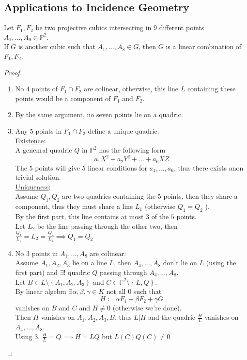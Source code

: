 \documentclass[../main.tex]{subfiles}
\begin{document}
\subsection{Applications to Incidence Geometry}
\begin{thm}
	Let $F_1,F_2$ be two projective cubics intersecting in $9$ different points $A_1,\ldots, A_9\in \mathbb{P}^{2}$.\\
	If $G$ is another cubic such that $A_1,\ldots, A_8\in G$, then $G$ is a linear combination of $F_1,F_2$.
\end{thm}
\begin{proof}
\begin{enumerate}
\item No 4 points of $F_1\cap F_2$ are colinear, otherwise, this line $L$ containing these points would be a component of $F_1$ and $F_2$.
\item By the same argument, no seven points lie on a quadric.
\item Any 5 points in $F_1\cap F_2$ define a unique quadric.\\
\underline{Existence}:\\
A genenral quadric $Q$ in $\mathbb{P}^{2}$ has the following form
\[ 
a_1X^{2}+ a_2Y^{2}+ \ldots + a_6 XZ
\]
The 5 points will give 5 linear conditions for $a_1, \ldots, a_6$, thus there exists  anon trivial solution.\\
\underline{Uniqueness}:\\
Assume $Q_1,Q_2$ are two quadrics containing the $5$ points, then they share a component, thus they must share a line $L_1$ (otherwise $Q_1= Q_2$ ).\\
By the first part, this line contains at most 3 of the $5$ points.\\
Let $L_2$ be the line passing through the other two, then $ \frac{Q_1}{L_1}= L_2= \frac{Q_2}{L_1}\implies Q_1= Q_2$ 
\item No $3$ points in $A_1,\ldots, A_8$ are colinear: \\
	Assume $A_1,A_2,A_3$ lie on a line $L$, then $A_4,\ldots, A_8$ don't lie on $L$ (using the first part) and $\exists!$ quadric $Q$ passing through  $A_4,\ldots, A_8$.\\
	Let $B\in L\setminus \left\{ A_1,A_2,A_3 \right\} $ and $C\in \mathbb{P}^{2}\setminus \left\{ L,Q \right\} $.\\
	By linear algebra $\exists \alpha,\beta,\gamma\in K$ not all $0$ such that
	\[ 
	H \coloneqq  \alpha F_1 + \beta F_2 + \gamma G
	\]
	vanishes on $B$ and $C$ and $H\neq 0$ (otherwise we're done).\\
	Then $H$ vanishes on $A_1,A_2,A_3,B$, thus $L|H$ and the quadric $\frac{H}{L}$ vanishes on $A_4,\ldots, A_8$.\\
	Using 3, $\frac{H}{L}= Q\implies H = LQ$ but $L( C ) Q( C)\neq 0$ 


\end{enumerate}
\end{proof}
\end{document}
